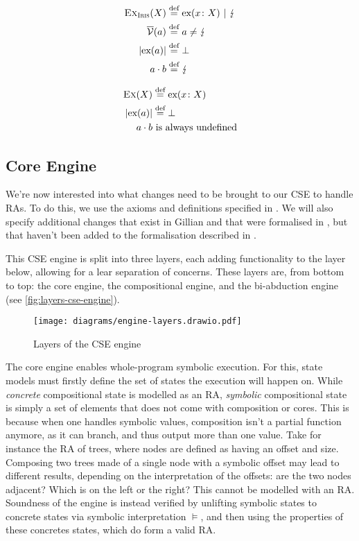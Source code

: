 \noindent\begin{minipage}{.5\linewidth}
\begin{align*}
	\textsc{Ex}_{\textsc{Iris}}(X) &\stackrel{\textnormal{def}}= \text{ex}(x\colon X) ~|~ \lightning \\
	\overline{\cal V}(a) &\stackrel{\textnormal{def}}= a \neq \lightning \\
	|\text{ex}(a)| &\stackrel{\textnormal{def}}= \bot\\
	a \cdot b &\stackrel{\textnormal{def}}= \lightning
\end{align*}\end{minipage}%
\begin{minipage}{.5\linewidth}
\begin{align*}
	\textsc{Ex}(X) &\stackrel{\textnormal{def}}= \text{ex}(x\colon X) \\
	|\text{ex}(a)| &\stackrel{\textnormal{def}}= \bot\\
	a \cdot b & \text{ is always undefined}
\end{align*}\end{minipage}


\subsection{Core Engine}

We're now interested into what changes need to be brought to our CSE to handle RAs. To do this, we use the axioms and definitions specified in \cite{cse2}. We will also specify additional changes that exist in Gillian and that were formalised in \cite{sacha-phd}, but that haven't been added to the formalisation described in \cite{cse2}.

This CSE engine is split into three layers, each adding functionality to the layer below, allowing for a lear separation of concerns. These layers are, from bottom to top: the core engine, the compositional engine, and the bi-abduction engine (see \autoref{fig:layers-cse-engine}).

\begin{figure}
	\centering
	\texttt{[image: diagrams/engine-layers.drawio.pdf]}
	\caption{Layers of the CSE engine}
	\label{fig:layers-cse-engine}
\end{figure}

The core engine enables whole-program symbolic execution. For this, state models must firstly define the set of states the execution will happen on. While \emph{concrete} compositional state is modelled as an RA, \emph{symbolic} compositional state is simply a set of elements that does not come with composition or cores. This is because when one handles symbolic values, composition isn't a partial function anymore, as it can branch, and thus output more than one value. Take for instance the RA of trees, where nodes are defined as having an offset and size. Composing two trees made of a single node with a symbolic offset may lead to different results, depending on the interpretation of the offsets: are the two nodes adjacent? Which is on the left or the right? This cannot be modelled with an RA. Soundness of the engine is instead verified by unlifting symbolic states to concrete states via symbolic interpretation $\models$, and then using the properties of these concretes states, which do form a valid RA. 

